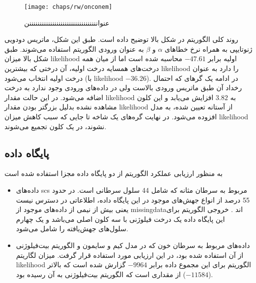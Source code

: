 \begin{figure}[!ht]
	\centerline{\texttt{[image: chaps/rw/onconem]}}
	\caption{عنوانننننننننننننننننننننننننننننننننن}
	\label{fig:ch_rw:onconem}
\end{figure}

روند کلی الگوریتم  در شکل بالا توضیح داده است. طبق این شکل، ماتریس دودویی ژنوتایپی به همراه نرخ خطاهای $\alpha$ و $\beta$ به عنوان ورودی الگوریتم استفاده می‌شوند. طبق شکل بالا میزان \gls{likelihood} اولیه برابر $-47.61$  محاسبه شده است اما از میان همه درخت‌های همسایه درخت اولیه، آن درختی که بیشترین \gls{likelihood} را دارد به عنوان درخت اولیه انتخاب می‌شود (با \gls{likelihood} $-36.26$). در ادامه یک گرهای که احتمال رخداد آن طبق ماتریس ورودی بالاست ولی در داده‌های ورودی وجود ندارد به درخت اضافه می‌شود. در این حالت مقدار \gls{likelihood} به $3.82$ افزایش می‌یابد و این کلون مشاهده نشده بدلیل بزرگتر بودن مقدار \gls{likelihood} از آستانه تعیین شده، به مدل افزوده می‌شود. در نهایت گره‌های یک شاخه تا جایی که سبب کاهش میزان \gls{likelihood} نشوند، در یک کلون تجمیع می‌شوند. 
\subsection{پایگاه داده}

به منظور ارزیابی عملکرد الگوریتم  از دو پایگاه داده مجزا استفاده شده است
\begin{itemize}
	\item     داده‌های  \gls{scs} مربوط به سرطان مثانه که شامل 44 سلول سرطانی است. در حدود 55 درصد از انواع جهش‌های موجود در این پایگاه داده، اطلاعاتی در دسترس نیست یعنی بیش از نیمی از داده‌های موجود از \gls{missingdata}‌اند . خروجی الگوریتم  برای این پایگاه داده یک درخت فیلوژنی با سه کلون اصلی می‌باشد و یک چهارم سلول‌های جهش‌یافته را شامل می‌شود.  
	\item     داده‌های مربوط به سرطان خون که در مدل کیم و سایمون و الگوریتم بیت‌فیلوژنی از آن استفاده شده بود، در این ارزیابی مورد استفاده قرار گرفت. میزان لگاریتم \gls{likelihood} الگوریتم  برای این مجموع داده برابر $-9964$ گزارش شده است که بالاتر از مقداری است که الگوریتم بیت‌فیلوژنی به آن رسیده بود ($-11584$).  
\end{itemize}



